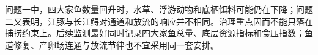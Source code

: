 问题一中，四大家鱼数量回升时，水草、浮游动物和底栖饵料可能仍在下降；问题二又表明，江豚与长江鲟对通道和放流的响应并不相同。治理重点因而不能只落在捕捞约束上。后续监测最好同时记录四大家鱼总量、底层资源指标和食压指数；鱼道修复、产卵场连通与放流节律也不宜采用同一套安排。
